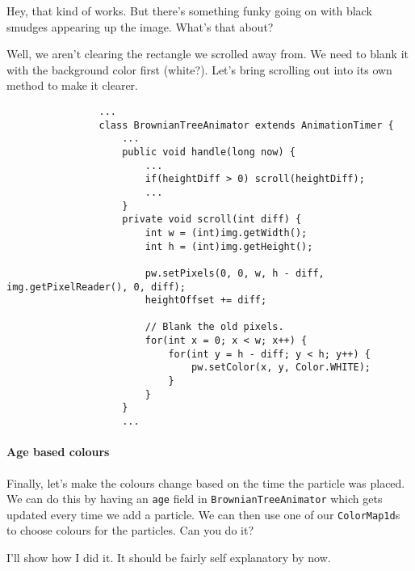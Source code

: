 \documentclass{article}
\begin{document}
            Hey, that kind of works.  But there's something funky going on with black smudges appearing up the image.  What's that about?
            
            \newpage
            Well, we aren't clearing the rectangle we scrolled away from.  We need to blank it with the background color first (white?).
            Let's bring scrolling out into its own method to make it clearer.

            \begin{verbatim}
                ...            
                class BrownianTreeAnimator extends AnimationTimer {
                    ...
                    public void handle(long now) {
                        ...
                        if(heightDiff > 0) scroll(heightDiff);
                        ...
                    }
                    private void scroll(int diff) {
                        int w = (int)img.getWidth();
                        int h = (int)img.getHeight();
                    
                        pw.setPixels(0, 0, w, h - diff, img.getPixelReader(), 0, diff);
                        heightOffset += diff; 
                        
                        // Blank the old pixels.
                        for(int x = 0; x < w; x++) {
                            for(int y = h - diff; y < h; y++) {
                                pw.setColor(x, y, Color.WHITE);
                            }
                        }
                    }
                    ...
            \end{verbatim}
        
        \newpage
        \paragraph{Age based colours}
            Finally, let's make the colours change based on the time the particle was placed. We can do this by having an \texttt{age}
            field in \texttt{BrownianTreeAnimator} which gets updated every time we add a particle. We can then use one of our
            \texttt{ColorMap1d}s to choose colours for the particles.  Can you do it?
            
            I'll show how I did it.  It should be fairly self explanatory by now.
            
\end{document}
